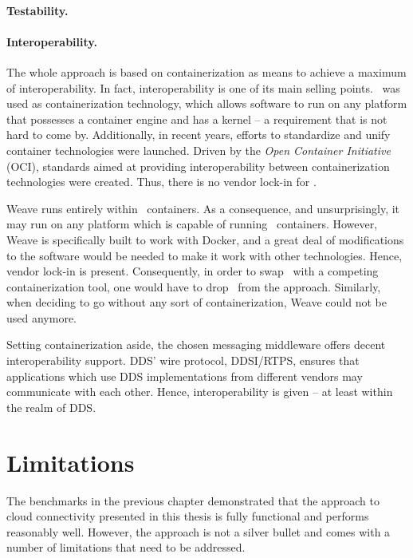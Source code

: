 \paragraph{Testability.}


\paragraph{Interoperability.}
The whole approach is based on containerization as means to achieve a maximum of interoperability. In fact, interoperability is one of its main selling points. \docker\ was used as containerization technology, which allows software to run on any platform that possesses a container engine and has a kernel -- a requirement that is not hard to come by. Additionally, in recent years, efforts to standardize and unify container technologies were launched. Driven by the \emph{Open Container Initiative} (OCI), standards aimed at providing interoperability between containerization technologies were created. Thus, there is no vendor lock-in for \docker .

Weave runs entirely within \docker\ containers. As a consequence, and unsurprisingly, it may run on any platform which is capable of running \docker\ containers. However, Weave is specifically built to work with Docker, and a great deal of modifications to the software would be needed to make it work with other technologies. Hence, vendor lock-in is present. Consequently, in order to swap \docker\ with a competing containerization tool, one would have to drop \wnet\ from the approach. Similarly, when deciding to go without any sort of containerization, Weave could not be used anymore.

Setting containerization aside, the chosen messaging middleware offers decent interoperability support. DDS' wire protocol, DDSI/RTPS, ensures that applications which use DDS implementations from different vendors may communicate with each other. Hence, interoperability is given -- at least within the realm of DDS. 



\section{Limitations}

The benchmarks in the previous chapter demonstrated that the approach to cloud connectivity presented in this thesis is fully functional and performs reasonably well. However, the approach is not a silver bullet and comes with a number of limitations that need to be addressed.

